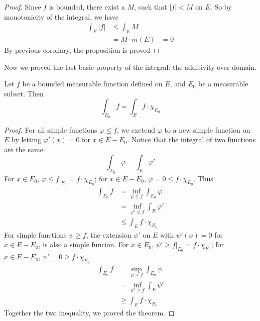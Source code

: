 \documentclass[lang=en, 12pt]{elegantbook}
\begin{document}
            \begin{proof}
                Since $f$ is bounded, there exist a $M$, such that $|f|< M$ on $E$. So by monotonicity of the integral, we have 
                \begin{equation*}
                    \begin{aligned}
                        \int_E |f| &\leq \int_E M\\
                        &= M \cdot m(E) 
                        &= 0 
                    \end{aligned}
                \end{equation*}
                By previous corollary, the proposition is proved 
            \end{proof}
            Now we proved the last basic property of the integral: the additivity over domain. 
            \begin{lemma}
                Let $f$ be a bounded measurable function defined on $E$, and $E_0$ be a measurable subset. Then   
                \begin{equation*}
                    \int_{E_0} f = \int_E f \cdot \chi_{E_0}
                \end{equation*}
            \end{lemma}
            \begin{proof}
                For all simple functions $\varphi \leq f$, we exetend $\varphi$ to a new simple function on $E$ by letting 
            $\varphi'(x) = 0$ for $x \in E-E_0$. Notice that the integral of two functions are the same: 
            $$\int_{E_0} \varphi = \int_E \varphi'$$
            For $x \in E_0$, $\varphi \leq f|_{E_0} = f \cdot \chi_{E_0}$; for $x \in E-E_0$, $\varphi = 0 \leq f\cdot \chi_{E_0}$. Thus  
            \begin{equation*}
                \begin{aligned}
                    \int_{E_0} f &= \inf_{\varphi \leq f} \int_{E_0} \varphi \\
                    &= \inf_{\varphi' \leq f} \int_E \varphi' \\
                    &\leq \int_E f \cdot \chi_{E_0}
                \end{aligned}
            \end{equation*}
                For simple functions $\psi \geq f$, the extension $\psi'$ on $E$ with $\psi'(x) = 0$ for $x \in E-E_0$, is also a simple 
            funcion. For $x \in E_0$, $\psi' \geq f|_{E_0} = f \cdot \chi_{E_0}$; for $x \in E-E_0$, $\psi' = 0 \geq f\cdot \chi_{E_0}$.   
            \begin{equation*}
                \begin{aligned}
                    \int_{E_0} f &= \sup_{\psi \geq f} \int_{E_0} \psi \\
                    &= \inf_{\psi' \geq f} \int_E \psi' \\
                    &\geq \int_E f \cdot \chi_{E_0}
                \end{aligned}
            \end{equation*}
            Together the two inequality, we proved the theorem. 
            \end{proof}
\end{document}
